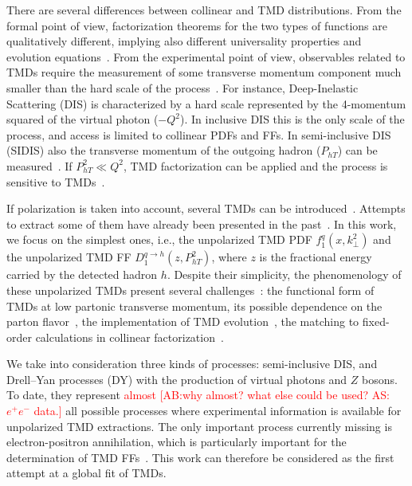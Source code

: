 \documentclass[aps,preprintnumbers,showpacs,nofootinbib,superscriptaddress,floatfix]{revtex4}
\newcommand{\T}{\perp}
\begin{document}
There are several differences between collinear and TMD distributions. From
the formal point of view, factorization theorems for the two types of
functions are qualitatively different, implying also different universality
properties and evolution equations~\cite{Rogers:2015sqa}. From the
experimental point 
of view, observables related to TMDs require the measurement of some transverse
momentum component much smaller than the hard scale of the
process~\cite{Bacchetta:2016ccz,Radici:2016hbh}.  For
instance, Deep-Inelastic Scattering (DIS) is characterized by a hard scale represented by the
4-momentum squared of the virtual photon ($-Q^2$). In inclusive DIS this is
the only scale of the process, and access is limited to collinear PDFs
and FFs. In semi-inclusive DIS (SIDIS) also the transverse momentum of the
outgoing  
hadron ($P_{hT}$) can be measured~\cite{Mulders:1995dh,Bacchetta:2006tn}. 
If $P_{hT}^2\ll Q^2$, TMD
factorization can be applied and the process is sensitive to
TMDs~\cite{Collins:2011zzd}. 


If polarization is taken into account, several TMDs can be
introduced~\cite{Mulders:1995dh,Boer:1997nt,%
Bacchetta:2000jk,%
Mulders:2000sh,%
Boer:2016xqr%
}. Attempts to extract some of them have already been presented in the past~\cite{Bacchetta:2011gx,Anselmino:2012aa,Echevarria:2014xaa,Anselmino:2016uie,%
Lu:2009ip,Barone:2015ksa,%
Lefky:2014eia,%
Anselmino:2013vqa,Kang:2015msa%
}.  In
this work, we focus on the simplest ones, i.e., the unpolarized TMD
PDF $f_1^q(x,k_{\T}^2)$ and the unpolarized TMD
FF $D_1^{q \to h}(z,P_{hT}^2)$, where $z$ is
  the fractional energy carried by the detected hadron $h$. Despite their
  simplicity, the phenomenology of these unpolarized TMDs present several
  challenges~\cite{Signori:2016lvd}: the functional form of TMDs at low
  partonic transverse momentum, its possible dependence on the parton
  flavor~\cite{Signori:2013mda}, the implementation of TMD
  evolution~\cite{Bacchetta:2015ora,Rogers:2015sqa}, the matching to
  fixed-order calculations in collinear
  factorization~\cite{Collins:2016hqq}. 

We take into consideration three kinds of processes: semi-inclusive DIS, and
Drell--Yan processes (DY) with the production of virtual photons and $Z$
bosons. To date, they represent \textcolor{red}{almost [AB:why almost? what
  else could be used? AS: $e^+e^-$ data.]} all possible processes
  where experimental information is available for unpolarized TMD
  extractions. 
The only important
process currently missing is electron-positron annihilation, which is
particularly important for the determination of TMD
FFs~\cite{Bacchetta:2015ora}. This work can therefore be considered as the
first attempt at a global fit of TMDs.  
\end{document}
